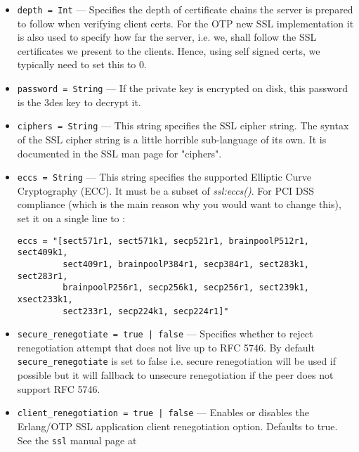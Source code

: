 \documentclass[11pt,oneside,english]{book}
\begin{document}
\begin{itemize}
\begin{itemize}
               \item \verb+depth = Int+ --- Specifies the depth of certificate
                 chains the server is prepared to follow when verifying client
                 certs. For the OTP new SSL implementation it is also used to
                 specify how far the server, i.e. we, shall follow the SSL
                 certificates we present to the clients. Hence, using self
                 signed certs, we typically need to set this to 0.

               \item \verb+password = String+ --- If the private key is
                 encrypted on disk, this password is the 3des key to decrypt it.

               \item \verb+ciphers = String+ --- This string specifies the SSL
                 cipher string.  The syntax of the SSL cipher string is a little
                 horrible sub-language of its own.  It is documented in the SSL
                 man page for "ciphers".

               \item \verb+eccs = String+ --- This string specifies the
                 supported Elliptic Curve Cryptography (ECC).
                 It must be a subset of \textit{ssl:eccs()}.
                 For PCI DSS compliance (which is the main reason why you
                 would want to change this), set it on a single line to :
\begin{verbatim}
eccs = "[sect571r1, sect571k1, secp521r1, brainpoolP512r1, sect409k1,
         sect409r1, brainpoolP384r1, secp384r1, sect283k1, sect283r1,
         brainpoolP256r1, secp256k1, secp256r1, sect239k1, xsect233k1,
         sect233r1, secp224k1, secp224r1]"
\end{verbatim}

               \item \verb+secure_renegotiate = true | false+ --- Specifies whether
                 to reject renegotiation attempt that does not live up to RFC
                 5746. By default \verb+secure_renegotiate+ is set to false
                 i.e. secure renegotiation will be used if possible but it will
                 fallback to unsecure renegotiation if the peer does not support
                 RFC 5746.

               \item \verb+client_renegotiation = true | false+ --- Enables or
                 disables the Erlang/OTP SSL application client
                 renegotiation option.  Defaults to true. See the
                 \verb+ssl+ manual page at
                 

\end{itemize}
\end{itemize}
\end{document}
